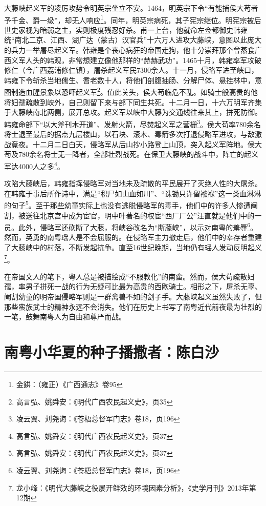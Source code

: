 大藤峡起义军的凌厉攻势令明英宗坐立不安。1464，明英宗下令“有能捕侯大苟者予千金、爵一级”，却无人响应\footnote{金鉷：（雍正）《广西通志》卷95}。同年，明英宗病死，其子宪宗继位。明宪宗被后世史家视为暗弱之主，实则极度残忍好杀。甫一上台，他就命左佥都御史韩雍统“南北二京、江西、湖广达（蒙古）汉官兵”十六万人进攻大藤峡，意图以此庞大的兵力一举屠尽起义军。韩雍是个丧心病狂的帝国走狗，他十分崇拜那个曾蒸食广西义军人头的韩观，非常想建立像他那样的“赫赫武功”。1465十月，韩雍率军攻破修仁（今广西荔浦修仁镇），屠杀起义军民7300余人。十一月，侵略军进至峡口，韩雍下令斩杀当地儒生、耆老数十人，将他们剖腹抽肠、分解尸体、悬挂林中，意图制造血腥景象以恐吓起义军\footnote{高言弘、姚舜安：《明代广西农民起义史》，页35}。值此关头，侯大苟临危不乱。如骑士般高贵的他将妇孺疏散到峡外，自己则留下来与部下同生共死。十二月一日，十六万明军齐集于大藤峡南北两侧，展开总攻。起义军以峡中大藤为交通线往来其上，拼死防御。韩雍命部下“以大斧刊木开道”、发射火箭，尽焚起义军之营栅\footnote{凌云翼、刘尧诲：《苍梧总督军门志》卷18，页196}。侯大苟率780余名将士退至最后的据点九层楼山，以石块、滚木、毒箭多次打退侵略军进攻，与敌激战竟夜。十二月二日白天，侵略军从后山抄小路登上山顶，突入起义军阵地。侯大苟及780余名将士无一降者，全部壮烈战死。在保卫大藤峡的战斗中，阵亡的起义军达4000人之多\footnote{高言弘、姚舜安：《明代广西农民起义史》，页37}。

攻陷大藤峡后，韩雍指挥侵略军对当地未及疏散的平民展开了灭绝人性的大屠杀。在韩雍于事后所作诗中，满是“积尸如山血如川”、“诛锄只许留襁褓”这一类血淋淋的句子\footnote{高言弘、姚舜安：《明代广西农民起义史》，页37}。至于那些幼童实际上也没有逃脱侵略军的毒手，他们中的许多人惨遭阉割，被送往北京宫中成为宦官，明中叶著名的权宦“西厂厂公”汪直就是他们中的一员。此外，侵略军还砍断了大藤，将峡谷改名为“断藤峡”，以示对南粤的羞辱\footnote{凌云翼、刘尧诲：《苍梧总督军门志》卷18，页196}。然而，英勇的南粤瑶人是不会屈服的。在侵略军主力撤走后，他们中的幸存者重建了大藤峡中的村落，不断发起抗争。直至16世纪晚期，当地仍有瑶人发动反明起义\footnote{龙小峰：《明代大藤峡之役屡开鲜效的环境因素分析》，《史学月刊》2013年第12期}。

在帝国文人的笔下，粤人总是被描绘成“不服教化”的南蛮。然而，侯大苟疏散妇孺，率男子拼死一战的行为无疑可比最为高贵的西欧骑士。相形之下，屠杀无辜、阉割幼童的明帝国侵略军则是一群禽兽不如的刽子手。大藤峡起义虽然失败了，但那些蛮族武士的精神永远不会消失。他们在历史上书写了南粤近代前夜最为壮烈的一笔，鼓舞南粤人为自由和尊严而战。

\section[南粤小华夏的种子播撒者：陈白沙]{南粤小华夏的种子播撒者：陈白沙\protect{}}

